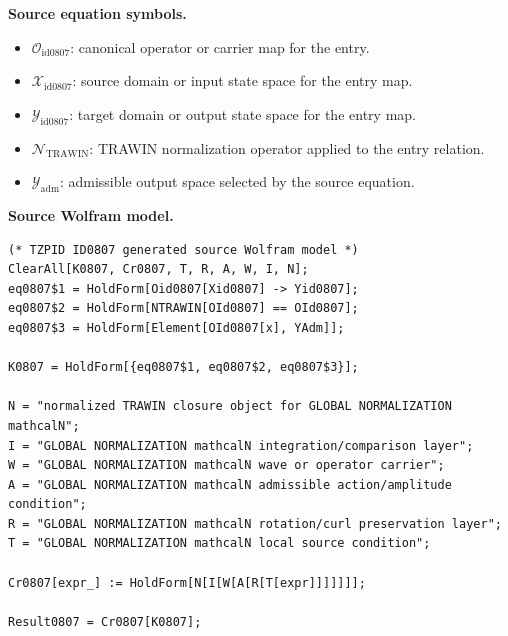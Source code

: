 \begin{minipage}[t]{0.49\linewidth}
\begingroup
\small
\raggedright
\textbf{Source equation symbols.}\par
\begin{itemize}[leftmargin=1.35em,itemsep=1pt,topsep=1pt,parsep=0pt]
    \item $\mathcal{O}_{\mathrm{id0807}}$: canonical operator or carrier map for the entry.
    \item $\mathcal{X}_{\mathrm{id0807}}$: source domain or input state space for the entry map.
    \item $\mathcal{Y}_{\mathrm{id0807}}$: target domain or output state space for the entry map.
    \item $\mathcal{N}_{\mathrm{TRAWIN}}$: TRAWIN normalization operator applied to the entry relation.
    \item $\mathcal{Y}_{\mathrm{adm}}$: admissible output space selected by the source equation.
\end{itemize}
\endgroup
\end{minipage}\hfill
\begin{minipage}[t]{0.47\linewidth}
\begingroup
\scriptsize
\raggedright
\textbf{Source Wolfram model.}\par
\begin{Verbatim}[fontsize=\tiny,breaklines=true,breakanywhere=true]
(* TZPID ID0807 generated source Wolfram model *)
ClearAll[K0807, Cr0807, T, R, A, W, I, N];
eq0807$1 = HoldForm[Oid0807[Xid0807] -> Yid0807];
eq0807$2 = HoldForm[NTRAWIN[OId0807] == OId0807];
eq0807$3 = HoldForm[Element[OId0807[x], YAdm]];

K0807 = HoldForm[{eq0807$1, eq0807$2, eq0807$3}];

N = "normalized TRAWIN closure object for GLOBAL NORMALIZATION mathcalN";
I = "GLOBAL NORMALIZATION mathcalN integration/comparison layer";
W = "GLOBAL NORMALIZATION mathcalN wave or operator carrier";
A = "GLOBAL NORMALIZATION mathcalN admissible action/amplitude condition";
R = "GLOBAL NORMALIZATION mathcalN rotation/curl preservation layer";
T = "GLOBAL NORMALIZATION mathcalN local source condition";

Cr0807[expr_] := HoldForm[N[I[W[A[R[T[expr]]]]]]];

Result0807 = Cr0807[K0807];
\end{Verbatim}
\endgroup
\end{minipage}

